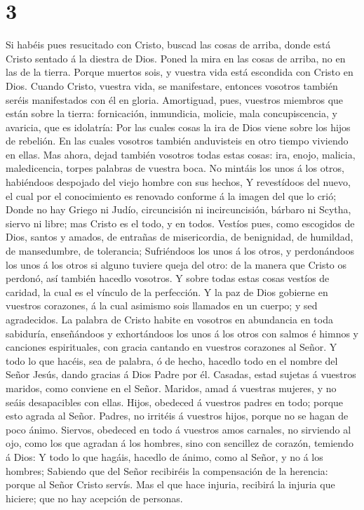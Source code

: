 \hypertarget{section-2}{%
\section{3}\label{section-2}}

 Si habéis pues resucitado con Cristo, buscad las cosas de
arriba, donde está Cristo sentado á la diestra de Dios. 
Poned la mira en las cosas de arriba, no en las de la tierra.
 Porque muertos sois, y vuestra vida está escondida con
Cristo en Dios.  Cuando Cristo, vuestra vida, se
manifestare, entonces vosotros también seréis manifestados con él en
gloria.  Amortiguad, pues, vuestros miembros que están sobre
la tierra: fornicación, inmundicia, molicie, mala concupiscencia, y
avaricia, que es idolatría:  Por las cuales cosas la ira de
Dios viene sobre los hijos de rebelión.  En las cuales
vosotros también anduvisteis en otro tiempo viviendo en ellas.
 Mas ahora, dejad también vosotros todas estas cosas: ira,
enojo, malicia, maledicencia, torpes palabras de vuestra boca.
 No mintáis los unos á los otros, habiéndoos despojado del
viejo hombre con sus hechos,  Y revestídoos del nuevo, el
cual por el conocimiento es renovado conforme á la imagen del que lo
crió;  Donde no hay Griego ni Judío, circuncisión ni
incircuncisión, bárbaro ni Scytha, siervo ni libre; mas Cristo es el
todo, y en todos.  Vestíos pues, como escogidos de Dios,
santos y amados, de entrañas de misericordia, de benignidad, de
humildad, de mansedumbre, de tolerancia;  Sufriéndoos los
unos á los otros, y perdonándoos los unos á los otros si alguno tuviere
queja del otro: de la manera que Cristo os perdonó, así también hacedlo
vosotros.  Y sobre todas estas cosas vestíos de caridad, la
cual es el vínculo de la perfección.  Y la paz de Dios
gobierne en vuestros corazones, á la cual asimismo sois llamados en un
cuerpo; y sed agradecidos.  La palabra de Cristo habite en
vosotros en abundancia en toda sabiduría, enseñándoos y exhortándoos los
unos á los otros con salmos é himnos y canciones espirituales, con
gracia cantando en vuestros corazones al Señor.  Y todo lo
que hacéis, sea de palabra, ó de hecho, hacedlo todo en el nombre del
Señor Jesús, dando gracias á Dios Padre por él.  Casadas,
estad sujetas á vuestros maridos, como conviene en el Señor.
 Maridos, amad á vuestras mujeres, y no seáis desapacibles
con ellas.  Hijos, obedeced á vuestros padres en todo;
porque esto agrada al Señor.  Padres, no irritéis á
vuestros hijos, porque no se hagan de poco ánimo.  Siervos,
obedeced en todo á vuestros amos carnales, no sirviendo al ojo, como los
que agradan á los hombres, sino con sencillez de corazón, temiendo á
Dios:  Y todo lo que hagáis, hacedlo de ánimo, como al
Señor, y no á los hombres;  Sabiendo que del Señor
recibiréis la compensación de la herencia: porque al Señor Cristo
servís.  Mas el que hace injuria, recibirá la injuria que
hiciere; que no hay acepción de personas.

